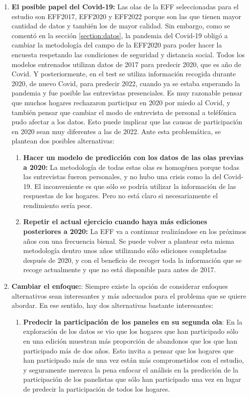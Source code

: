 \begin{enumerate}
    \item \textbf{El posible papel del Covid-19:} Las olas de la EFF seleccionadas para el estudio son EFF2017, EFF2020 y EFF2022 porque son las que tienen mayor cantidad de datos y también los de mayor calidad. Sin embargo, como se comentó en la sección \ref{section:datos}, la pandemia del Covid-19 obligó a cambiar la metodología del campo de la EFF2020 para poder hacer la encuesta respetando las condiciones de seguridad y distancia social. Todos los modelos entrenados utilizan datos de 2017 para predecir 2020, que es año de Covid. Y posteriormente, en el test se utiliza información recogida durante 2020, de nuevo Covid, para predecir 2022, cuando ya se estaba superando la pandemia y fue posible las entrevistas presenciales. Es muy razonable pensar que muchos hogares rechazaron participar en 2020 por miedo al Covid, y también pensar que cambiar el modo de entrevista de personal a teléfónica pudo afectar a los datos. Esto puede implicar que las causas de participación en 2020 sean muy diferentes a las de 2022. Ante esta problemática, se plantean dos posibles alternativas:
    \begin{enumerate}[noitemsep]
        \item \textbf{Hacer un modelo de predicción con los datos de las olas previas a 2020:} La metodología de todas estas olas es homogénea porque todas las entrevistas fueron personales, y no hubo una crisis como la del Covid-19. El inconveniente es que sólo se podría utilizar la información de las respuestas de los hogares. Pero no está claro si necesariamente el rendimiento sería peor.
        \item \textbf{Repetir el actual ejercicio cuando haya más ediciones posteriores a 2020:} La EFF va a continuar realizándose en los próximos años con una frecuencia bienal. Se puede volver a plantear esta misma metodología dentro unos años utilizando sólo ediciones completadas después de 2020, y con el beneficio de recoger toda la información que se recoge actualmente y que no está disponible para antes de 2017.
    \end{enumerate}
    \item\textbf{Cambiar el enfoque:}: Siempre existe la opción de considerar enfoques alternativos sean interesantes y más adecuados para el problema que se quiere abordar. En ese sentido, hay dos alternativas bastante interesantes:
    \begin{enumerate}[noitemsep]
        \item \textbf{Predecir la participación de los paneles en su segunda ola}: En la exploración de los datos se vio que los hogares que han participado sólo en una edición muestran más proporción de abandonos que los que han participado más de dos años. Esto invita a pensar que los hogares que han participado más de una vez están más comprometidos con el estudio, y seguramente merezca la pena enfocar el análisis en la predicción de la participación de los panelistas que sólo han participado una vez en lugar de predecir la participación de todos los hogares.

\end{enumerate}
\end{enumerate}

